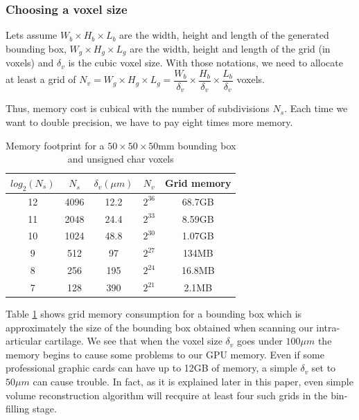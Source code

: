\documentclass[12pt,journal,compsoc]{IEEEtran}
\begin{document}
\subsubsection{Choosing a voxel size}

Lets assume $W_b\times H_b\times L_b$ are the width, height and length of the generated bounding box, $W_g\times H_g\times L_g$ are the width, height and length of the grid (in voxels) and $\delta_v$ is the cubic voxel size. With those notations, we need to allocate at least a grid of $N_v = W_g\times H_g\times L_g =  \dfrac{W_b}{\delta_v}\times \dfrac{H_b}{\delta_v}\times \dfrac{L_b}{\delta_v}$ voxels. \par

\vspace{0.2cm}
Thus, memory cost is cubical with the number of subdivisions $N_s$. Each time we want to double precision, we have to pay eight times more memory.

\begin{table}[!t]
\renewcommand{\arraystretch}{1.3}
\caption{Memory footprint for a $50\times 50\times 50$mm bounding box and unsigned char voxels}
\label{memory_table}
\centering
\begin{tabular}{|c|c||c|c||c|}
\hline
$log_2(N_s)$ & $N_s$ & $\delta_v (\mu m)$ & $N_v$ & Grid memory \\
\hline
12 & 4096 & 12.2 & $2^{36}$ & 68.7GB\\\hline
11 & 2048 & 24.4 & $2^{33}$ & 8.59GB\\\hline
10 & 1024 & 48.8 & $2^{30}$ & 1.07GB\\\hline
9 & 512 & 97 & $2^{27}$ & 134MB\\\hline
8 & 256 & 195 & $2^{24}$ & 16.8MB\\\hline
7 & 128 & 390 & $2^{21}$ & 2.1MB\\\hline
\end{tabular}
\end{table}
Table \ref{memory_table} shows grid memory consumption for a bounding box which is approximately the size of the bounding box obtained when scanning our intra-articular cartilage.
We see that when the voxel size $\delta_v$ goes under $100\mu m$ the memory begins to cause some problems to our GPU memory.
Even if some professional graphic cards can have up to 12GB of memory, a simple $\delta_v$ set to $50\mu m$ can cause trouble.
In fact, as it is explained later in this paper, even simple volume reconstruction algorithm will recquire at least four such grids in the bin-filling stage.
\end{document}

